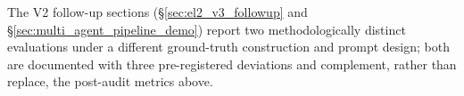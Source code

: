 The V2 follow-up sections (§\ref{sec:el2_v3_followup} and §\ref{sec:multi_agent_pipeline_demo}) report two methodologically distinct evaluations under a different ground-truth construction and prompt design; both are documented with three pre-registered deviations and complement, rather than replace, the post-audit metrics above.
